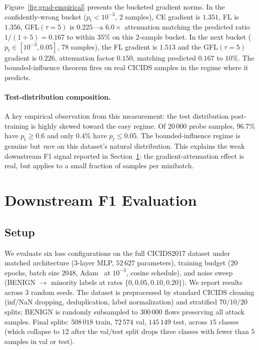 \documentclass[conference]{IEEEtran}
\theoremstyle{definition}
\begin{document}
Figure~\ref{fig:grad-empirical} presents the bucketed gradient norms. In the confidently-wrong bucket ($p_t < 10^{-3}$, 2 samples), CE gradient is $1.351$, FL is $1.356$, GFL$(\tau{=}5)$ is $0.225$---a $6.0\times$ attenuation matching the predicted ratio $1/(1+5) = 0.167$ to within $35\%$ on this 2-sample bucket. In the next bucket ($p_t \in [10^{-3}, 0.05]$, 78 samples), the FL gradient is $1.513$ and the GFL$(\tau{=}5)$ gradient is $0.226$, attenuation factor $0.150$, matching predicted $0.167$ to $10\%$. The bounded-influence theorem fires on real CICIDS samples in the regime where it predicts.

\paragraph{Test-distribution composition.}
A key empirical observation from this measurement: the test distribution post-training is highly skewed toward the easy regime. Of $20\,000$ probe samples, $96.7\%$ have $p_t \ge 0.6$ and only $0.4\%$ have $p_t \le 0.05$. The bounded-influence regime is genuine but \emph{rare} on this dataset's natural distribution. This explains the weak downstream F1 signal reported in Section~\ref{sec:exp-f1}: the gradient-attenuation effect is real, but applies to a small fraction of samples per minibatch.

\section{Downstream F1 Evaluation}
\label{sec:exp-f1}

\subsection{Setup}
We evaluate six loss configurations on the full CICIDS2017 dataset under matched architecture (3-layer MLP, $52\,627$ parameters), training budget ($20$ epochs, batch size $2048$, Adam~\cite{kingma2014adam} at $10^{-3}$, cosine schedule), and noise sweep (BENIGN $\to$ minority labels at rates $\{0, 0.05, 0.10, 0.20\}$). We report results across $3$ random seeds. The dataset is preprocessed by standard CICIDS cleaning (inf/NaN dropping, deduplication, label normalization) and stratified $70/10/20$ splits; BENIGN is randomly subsampled to $300\,000$ flows preserving all attack samples. Final splits: $508\,018$ train, $72\,574$ val, $145\,149$ test, across $15$ classes (which collapse to $12$ after the val/test split drops three classes with fewer than $5$ samples in val or test).
\end{document}
